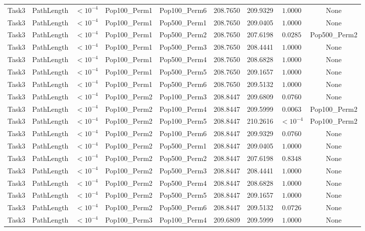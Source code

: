 \documentclass[8pt]{article}
\begin{document}
\begin{longtable}{llccccccc}
Task3 & PathLength & $< 10^{-4}$ & Pop100\_Perm1 & Pop100\_Perm6 & 208.7650 & 209.9329 & $1.0000$ & None \\
Task3 & PathLength & $< 10^{-4}$ & Pop100\_Perm1 & Pop500\_Perm1 & 208.7650 & 209.0405 & $1.0000$ & None \\
Task3 & PathLength & $< 10^{-4}$ & Pop100\_Perm1 & Pop500\_Perm2 & 208.7650 & 207.6198 & $0.0285$ & Pop500\_Perm2 \\
Task3 & PathLength & $< 10^{-4}$ & Pop100\_Perm1 & Pop500\_Perm3 & 208.7650 & 208.4441 & $1.0000$ & None \\
Task3 & PathLength & $< 10^{-4}$ & Pop100\_Perm1 & Pop500\_Perm4 & 208.7650 & 208.6828 & $1.0000$ & None \\
Task3 & PathLength & $< 10^{-4}$ & Pop100\_Perm1 & Pop500\_Perm5 & 208.7650 & 209.1657 & $1.0000$ & None \\
Task3 & PathLength & $< 10^{-4}$ & Pop100\_Perm1 & Pop500\_Perm6 & 208.7650 & 209.5132 & $1.0000$ & None \\
Task3 & PathLength & $< 10^{-4}$ & Pop100\_Perm2 & Pop100\_Perm3 & 208.8447 & 209.6809 & $0.0760$ & None \\
Task3 & PathLength & $< 10^{-4}$ & Pop100\_Perm2 & Pop100\_Perm4 & 208.8447 & 209.5999 & $0.0063$ & Pop100\_Perm2 \\
Task3 & PathLength & $< 10^{-4}$ & Pop100\_Perm2 & Pop100\_Perm5 & 208.8447 & 210.2616 & $< 10^{-4}$ & Pop100\_Perm2 \\
Task3 & PathLength & $< 10^{-4}$ & Pop100\_Perm2 & Pop100\_Perm6 & 208.8447 & 209.9329 & $0.0760$ & None \\
Task3 & PathLength & $< 10^{-4}$ & Pop100\_Perm2 & Pop500\_Perm1 & 208.8447 & 209.0405 & $1.0000$ & None \\
Task3 & PathLength & $< 10^{-4}$ & Pop100\_Perm2 & Pop500\_Perm2 & 208.8447 & 207.6198 & $0.8348$ & None \\
Task3 & PathLength & $< 10^{-4}$ & Pop100\_Perm2 & Pop500\_Perm3 & 208.8447 & 208.4441 & $1.0000$ & None \\
Task3 & PathLength & $< 10^{-4}$ & Pop100\_Perm2 & Pop500\_Perm4 & 208.8447 & 208.6828 & $1.0000$ & None \\
Task3 & PathLength & $< 10^{-4}$ & Pop100\_Perm2 & Pop500\_Perm5 & 208.8447 & 209.1657 & $1.0000$ & None \\
Task3 & PathLength & $< 10^{-4}$ & Pop100\_Perm2 & Pop500\_Perm6 & 208.8447 & 209.5132 & $0.0726$ & None \\
Task3 & PathLength & $< 10^{-4}$ & Pop100\_Perm3 & Pop100\_Perm4 & 209.6809 & 209.5999 & $1.0000$ & None \\

\end{longtable}
\end{document}
